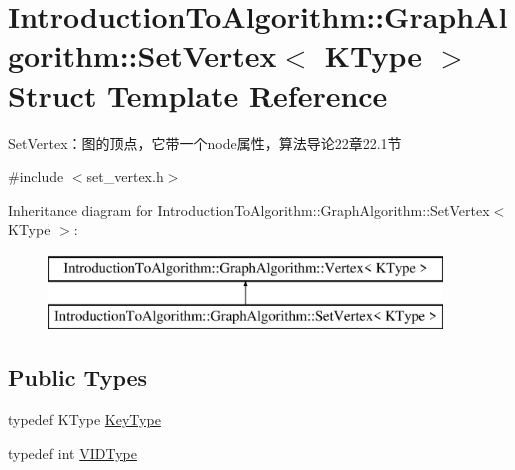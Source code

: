 \hypertarget{struct_introduction_to_algorithm_1_1_graph_algorithm_1_1_set_vertex}{}\section{Introduction\+To\+Algorithm\+:\+:Graph\+Algorithm\+:\+:Set\+Vertex$<$ K\+Type $>$ Struct Template Reference}
\label{struct_introduction_to_algorithm_1_1_graph_algorithm_1_1_set_vertex}


Set\+Vertex：图的顶点，它带一个node属性，算法导论22章22.1节  




{\ttfamily \#include $<$set\+\_\+vertex.\+h$>$}

Inheritance diagram for Introduction\+To\+Algorithm\+:\+:Graph\+Algorithm\+:\+:Set\+Vertex$<$ K\+Type $>$\+:\begin{figure}[H]
\begin{center}
\leavevmode
\includegraphics[height=2.000000cm]{struct_introduction_to_algorithm_1_1_graph_algorithm_1_1_set_vertex}
\end{center}
\end{figure}
\subsection*{Public Types}
\begin{DoxyCompactItemize}
\item 
typedef K\+Type \hyperlink{struct_introduction_to_algorithm_1_1_graph_algorithm_1_1_set_vertex_a0cfdcd9af991198be63495f7fb60965d}{Key\+Type}
\item 
typedef int \hyperlink{struct_introduction_to_algorithm_1_1_graph_algorithm_1_1_set_vertex_ae69791a589d95b0f4f378e08b75b041c}{V\+I\+D\+Type}
\end{DoxyCompactItemize}
